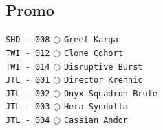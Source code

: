 \documentclass[a4paper,landscape]{article}
\begin{document}
\begin{multicols*}{5}
\section{Promo} 
\vspace{-2mm} 
\texttt{SHD - 008} \(\bigcirc\)  \texttt{Greef Karga} \vspace{-0.3mm}\\ 
\texttt{TWI - 012} \(\bigcirc\)  \texttt{Clone Cohort} \vspace{-0.3mm}\\ 
\texttt{TWI - 014} \(\bigcirc\)  \texttt{Disruptive Burst} \vspace{-0.3mm}\\ 
\texttt{JTL - 001} \(\bigcirc\)  \texttt{Director Krennic} \vspace{-0.3mm}\\ 
\texttt{JTL - 002} \(\bigcirc\)  \texttt{Onyx Squadron Brute} \vspace{-0.3mm}\\ 
\texttt{JTL - 003} \(\bigcirc\)  \texttt{Hera Syndulla} \vspace{-0.3mm}\\ 
\texttt{JTL - 004} \(\bigcirc\)  \texttt{Cassian Andor} \vspace{-0.3mm}\\ 

\end{multicols*}
\end{document}
